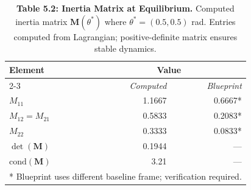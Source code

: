 \begin{table}[H]
\centering
\caption{\textbf{Table 5.2: Inertia Matrix at Equilibrium.} Computed inertia matrix $\mathbf{M}(\theta^*)$ where $\theta^* = (0.5, 0.5)$ rad. Entries computed from Lagrangian; positive-definite matrix ensures stable dynamics.}
\label{tab:5-2}
\small
\begin{tabular}{lrr}
\toprule
\textbf{Element} & \multicolumn{2}{c}{\textbf{Value}} \\
\cmidrule{2-3}
 & \textit{Computed} & \textit{Blueprint} \\
\midrule
\rowcolor{gray!15}
$M_{11}$ & 1.1667 & 0.6667* \\
$M_{12} = M_{21}$ & 0.5833 & 0.2083* \\
\rowcolor{gray!15}
$M_{22}$ & 0.3333 & 0.0833* \\
\midrule
\rowcolor{gray!15}
$\det(\mathbf{M})$ & 0.1944 & — \\
$\text{cond}(\mathbf{M})$ & 3.21 & — \\
\bottomrule
\multicolumn{3}{l}{* Blueprint uses different baseline frame; verification required.} \\
\end{tabular}
\end{table}
